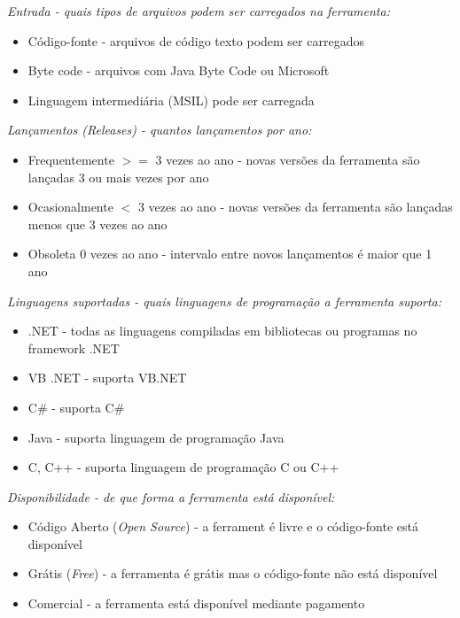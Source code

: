 \begin{description}

  \item {\it Entrada - quais tipos de arquivos podem ser carregados na ferramenta:}
    \begin{itemize}
      \item Código-fonte - arquivos de código texto podem ser carregados
      \item Byte code - arquivos com Java Byte Code ou Microsoft
      \item Linguagem intermediária (MSIL) pode ser carregada
    \end{itemize}

  \item {\it Lançamentos ({\it Releases}) - quantos lançamentos por ano:}
    \begin{itemize}
      \item Frequentemente $>=$ 3 vezes ao ano - novas versões da ferramenta são lançadas 3 ou mais vezes por ano
      \item Ocasionalmente $<$ 3 vezes ao ano - novas versões da ferramenta são lançadas menos que 3 vezes ao ano
      \item Obsoleta 0 vezes ao ano - intervalo entre novos lançamentos é maior que 1 ano
    \end{itemize}

  \item {\it Linguagens suportadas - quais linguagens de programação a ferramenta suporta:}
    \begin{itemize}
      \item .NET - todas as linguagens compiladas em bibliotecas ou programas no framework .NET
      \item VB .NET - suporta VB.NET
      \item C\# - suporta C\#
      \item Java - suporta linguagem de programação Java
      \item C, C++ - suporta linguagem de programação C ou C++
    \end{itemize}

  \item {\it Disponibilidade - de que forma a ferramenta está disponível:}
    \begin{itemize}
      \item Código Aberto ({\it Open Source}) - a ferrament é livre e o código-fonte está disponível
      \item Grátis ({\it Free}) - a ferramenta é grátis mas o código-fonte não está disponível
      \item Comercial - a ferramenta está disponível mediante pagamento
    \end{itemize}


\end{description}
